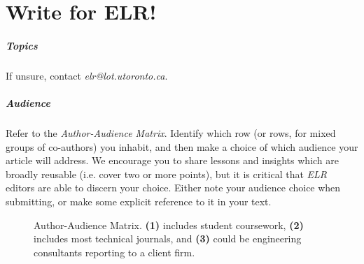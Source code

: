 \chapter*{Write for ELR!}

\paragraph{Topics}
If unsure, contact \emph{elr@lot.utoronto.ca}.

\paragraph{Audience}
Refer to the \emph{Author-Audience Matrix}.
Identify which row (or rows, for mixed groups of co-authors) you inhabit, and then make a choice of which audience your article will address.
We encourage you to share lessons and insights which are broadly reusable (i.e. cover two or more points), but it is critical that \emph{ELR} editors are able to discern your choice.
Either note your audience choice when submitting, or make some explicit reference to it in your text.
\begin{figure}
\centering
{}
\caption{Author-Audience Matrix. \textbf{(1)} includes student coursework, \textbf{(2)} includes most technical journals, and \textbf{(3)} could be engineering consultants reporting to a client firm.}
\end{figure}

